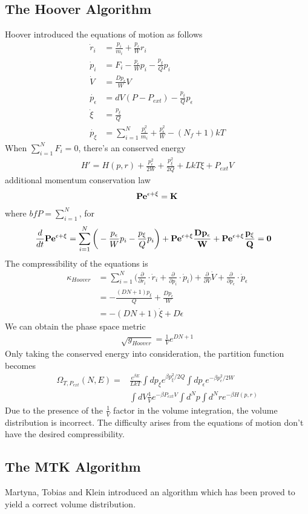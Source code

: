 \documentclass{article}
\begin{document}
\subsection{The Hoover Algorithm}
Hoover introduced the equations of motion as follows
\begin{align}
\dot{r}_i&=\frac{p_i}{m_i}+\frac{p_{\epsilon}}{W}r_i\nonumber\\ 
\dot{p}_i&=F_i-\frac{p_{\epsilon}}{W}p_i-\frac{p_{\xi}}{Q}p_i\nonumber\\
\dot{V}&=\frac{Dp_{\epsilon}}{W}V\nonumber\\
\dot{p_{\epsilon}}&=dV(P-P_{ext})-\frac{p_{\xi}}{Q}p_{\epsilon}\\
\dot{\xi}&=\frac{p_{\xi}}{Q}\nonumber\\
\dot{p_{\xi}}&=\sum^N_{i=1}\frac{p_i^2}{m_i}+\frac{p_{\epsilon}^2}{W}-(N_f+1)kT\nonumber
\end{align}
When $\sum_{i=1}^NF_i=0$, there's an conserved energy
\begin{align}
H'=H(p,r)+\frac{p_{\epsilon}^2}{2W}+\frac{p_{\xi}^2}{2Q}+LkT\xi+P_{ext}V
\end{align}
additional momentum conservation law
\begin{align}
\bf{P}e^{\epsilon+\xi}=K
\end{align}
where $bf{P}=\sum_{i=1}^N$, for
\begin{align}
\frac{d}{dt}\bf{P}e^{\epsilon+\xi}&=\sum_{i=1}^N\bigg(-\frac{p_{\epsilon}}{W}p_i-\frac{p_{\xi}}{Q}p_i\bigg)+\bf{P}e^{\epsilon+\xi}\frac{Dp_{\epsilon}}{W}+\bf{P}e^{\epsilon+\xi}\frac{p_{\xi}}{Q}=0
\end{align}
The compressibility of the equations is
\begin{align}
\kappa_{Hoover}&=\sum_{i=1}^N\bigg(\frac{\partial}{\partial r_i}\cdot\dot{r}_i+\frac{\partial}{\partial p_i}\cdot\dot{p}_i\bigg)+\frac{\partial}{\partial V}\dot{V}+\frac{\partial}{\partial p_{\epsilon}}\cdot\dot{p}_{\epsilon}\nonumber\\
&=-\frac{(DN+1)p_{\xi}}{Q}+\frac{Dp_{\epsilon}}{W}\\
&=-(DN+1)\dot{\xi}+D\dot{\epsilon}\nonumber
\end{align}
We can obtain the phase space metric 
\begin{align}
\sqrt{g_{Hoover}}=\frac{1}{V}e^{DN+1}
\end{align}
Only taking the conserved energy into consideration, the partition function becomes
\begin{align}
\Omega_{T,P_{ext}}(N,E)=&\frac{e^{\beta E}}{LkT}\int dp_{\xi}e^{\beta p_{\xi}^2/2Q}\int dp_{\epsilon}e^{-\beta p_{\epsilon}^2/2W}\nonumber\\
&\int dV\frac{1}{V}e^{-\beta P_{ext}V}\int d^Np\int d^Nre^{-\beta H(p,r)}
\end{align}
Due to the presence of the $\frac{1}{V}$ factor in the volume integration, the volume distribution is incorrect. The difficulty arises from the equations of motion don't have the desired compressibility.
\subsection{The MTK Algorithm}
Martyna, Tobias and Klein introduced an algorithm which has been proved to yield a correct volume distribution.
\end{document}
